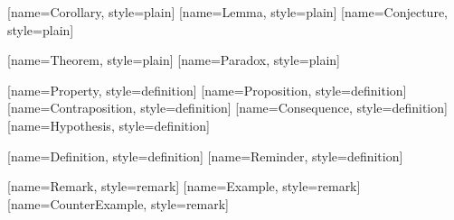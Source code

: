 


		[name=Corollary, style=plain]
		[name=Lemma, style=plain]
		[name=Conjecture, style=plain]

		[name=Theorem, style=plain]
		[name=Paradox, style=plain]

		[name=Property, style=definition]
		[name=Proposition, style=definition]
		[name=Contraposition, style=definition]
		[name=Consequence, style=definition]
		[name=Hypothesis, style=definition]

		[name=Definition, style=definition]
		[name=Reminder, style=definition]

		[name=Remark, style=remark]
		[name=Example, style=remark]
		[name=CounterExample, style=remark]



	\ExplSyntaxOn

